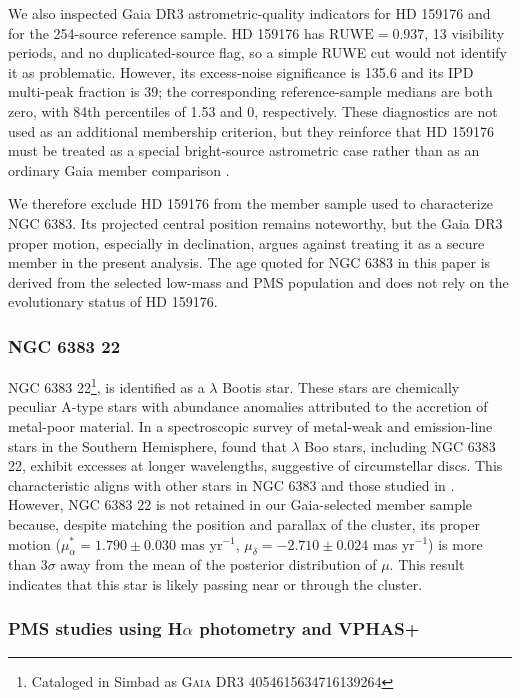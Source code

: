 \documentclass{aa}
\begin{document}
We also inspected Gaia DR3 astrometric-quality indicators for HD 159176 and for the 254-source reference sample. HD 159176 has $\mathrm{RUWE}=0.937$, 13 visibility periods, and no duplicated-source flag, so a simple RUWE cut would not identify it as problematic. However, its excess-noise significance is 135.6 and its IPD multi-peak fraction is 39; the corresponding reference-sample medians are both zero, with 84th percentiles of 1.53 and 0, respectively. These diagnostics are not used as an additional membership criterion, but they reinforce that HD 159176 must be treated as a special bright-source astrometric case rather than as an ordinary Gaia member comparison \citep{2022MNRAS.510.2597R}.

We therefore exclude HD 159176 from the member sample used to characterize NGC 6383. Its projected central position remains noteworthy, but the Gaia DR3 proper motion, especially in declination, argues against treating it as a secure member in the present analysis. The age quoted for NGC 6383 in this paper is derived from the selected low-mass and PMS population and does not rely on the evolutionary status of HD 159176.

\subsubsection{NGC 6383 22}
NGC 6383 22\footnote{Cataloged in Simbad as \textsc{Gaia DR3 4054615634716139264}}, is identified as a $\lambda$ Bootis star. These stars are chemically peculiar A-type stars with abundance anomalies attributed to the accretion of metal-poor material. In a spectroscopic survey of metal-weak and emission-line stars in the Southern Hemisphere, \citet{2020MNRAS.499.2701M} found that $\lambda$ Boo stars, including NGC 6383 22, exhibit excesses at longer wavelengths, suggestive of circumstellar discs. This characteristic aligns with other stars in NGC 6383 and those studied in \citet{2019MNRAS.484.5102K}. However, NGC 6383 22 is not retained in our Gaia-selected member sample because, despite matching the position and parallax of the cluster, its proper motion ($\mu_\alpha^* = 1.790 \pm 0.030$ mas yr$^{-1}$, $\mu_\delta = -2.710 \pm 0.024$ mas yr$^{-1}$) is more than $3\sigma$ away from the mean of the posterior distribution of $\mu$. This result indicates that this star is likely passing near or through the cluster.

\subsubsection{PMS studies using \texorpdfstring{H$\alpha$}{H-alpha} photometry and VPHAS+}
\end{document}
